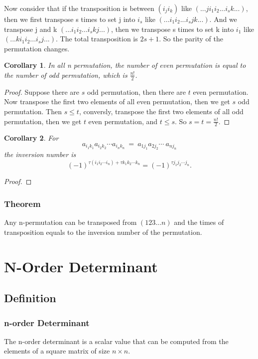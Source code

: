 \documentclass{article}
\newtheorem{corollary}{Corollary}[theorem]
\theoremstyle{definition}
\begin{document}
Now consider that if the transposition is between $(i_{j}i_{k})$ like 
$(...ji_{1}i_{2}...i_{s}k...)$, 
then we first transpose s times to set j into $i_{s}$ like 
$(...i_{1}i_{2}...i_{s}jk...)$. 
And we transpose j and k 
$(...i_{1}i_{2}...i_{s}kj...)$, 
then we transpose s times to set k into $i_{1}$ like 
$(...ki_{1}i_{2}...i_{s}j...)$.
The total transposition is $2s+1$. 
So the parity of the permutation changes.

\begin{corollary}
In all n permutation, the number of even permutation 
is equal to the number of odd permutation, which is 
$\frac{n!}{2}$.
\end{corollary}

\begin{proof}
Suppose there are $s$ odd permutation, then there are
$t$ even permutation. Now transpose the first two elements 
of all even permutation, then we get $s$ odd permutation.
Then $s\leq t$, conversly, transpose the first two elements 
of all odd permutation, then we get $t$ even permutation, and 
$t\leq s$. So $s=t=\frac{n!}{2}$.
\end{proof}

\begin{corollary}
    For $$a_{i_{1}k_{1}}a_{i_{2}k_{2}}\cdots a_{i_{n}k_{n}}\ =\ a_{1j_{1}}a_{2j_{2}}\cdots\ a_{nj_{n}}$$
    the inversion number is 
    $$(-1)^{\tau(i_{1}i_{2}\cdots i_{n})+\tau k_{1}k_{2}\cdots k_{n}}=(-1)^{\tau j_{1}j_{2}\cdots j_{n}}.$$
\end{corollary}
\begin{proof}

\end{proof}


\subsubsection{Theorem}
Any n-permutation can be transposed from $(123...n)$ and the times 
of transposition equals to the inversion number of the permutation.

\section{N-Order Determinant}
\subsection{Definition}
\subsubsection{n-order Determinant}
The n-order determinant is a scalar value that can be computed from 
the elements of a square matrix of size $n\times n$.
\end{document}

